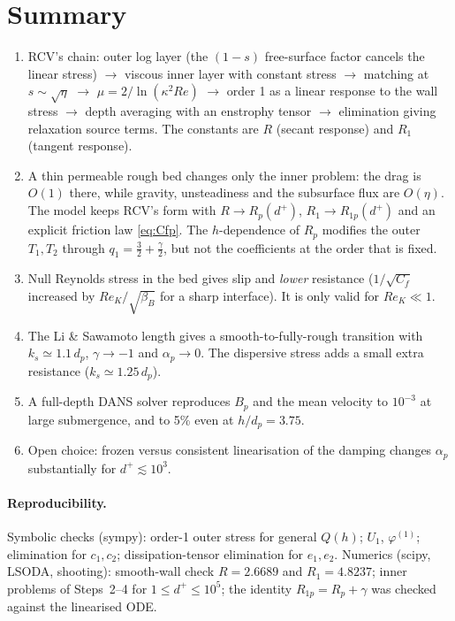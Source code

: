 \documentclass[10pt,a4paper]{article}
\newcommand{\Rp}{R_p}
\newcommand{\Rop}{R_{1p}}
\begin{document}
\section{Summary}
\begin{enumerate}[nosep]
\item RCV's chain: outer log layer (the $(1-s)$ free-surface factor cancels the linear stress) $\to$ viscous inner layer with constant stress $\to$ matching at $s\sim\sqrt\eta$ $\to$ $\mu=2/\ln(\kappa^2Re)$ $\to$ order 1 as a linear response to the wall stress $\to$ depth averaging with an enstrophy tensor $\to$ elimination giving relaxation source terms. The constants are $R$ (secant response) and $R_1$ (tangent response).
\item A thin permeable rough bed changes only the inner problem: the drag is $O(1)$ there, while gravity, unsteadiness and the subsurface flux are $O(\eta)$. The model keeps RCV's form with $R\to\Rp(d^+)$, $R_1\to\Rop(d^+)$ and an explicit friction law \eqref{eq:Cfp}. The $h$-dependence of $\Rp$ modifies the outer $T_1,T_2$ through $q_1=\tfrac32+\tfrac\gamma2$, but not the coefficients at the order that is fixed.
\item Null Reynolds stress in the bed gives slip and \emph{lower} resistance ($1/\sqrt{C_f}$ increased by $Re_K/\sqrt{\beta_B}$ for a sharp interface). It is only valid for $Re_K\ll1$.
\item The Li \& Sawamoto length gives a smooth-to-fully-rough transition with $k_s\simeq1.1\,d_p$, $\gamma\to-1$ and $\alpha_p\to0$. The dispersive stress adds a small extra resistance ($k_s\simeq1.25\,d_p$).
\item A full-depth DANS solver reproduces $B_p$ and the mean velocity to $10^{-3}$ at large submergence, and to 5\% even at $h/d_p=3.75$.
\item Open choice: frozen versus consistent linearisation of the damping changes $\alpha_p$ substantially for $d^+\lesssim10^3$.
\end{enumerate}

\paragraph{Reproducibility.} Symbolic checks (sympy): order-1 outer stress for general $Q(h)$; $U_1$, $\varphi^{(1)}$; elimination for $c_1,c_2$; dissipation-tensor elimination for $e_1,e_2$. Numerics (scipy, LSODA, shooting): smooth-wall check $R=2.6689$ and $R_1=4.8237$; inner problems of Steps~2--4 for $1\le d^+\le10^5$; the identity $\Rop=\Rp+\gamma$ was checked against the linearised ODE.
\end{document}
